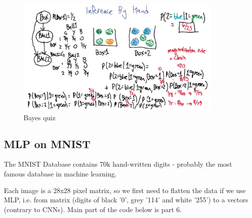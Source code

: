 \documentclass[11pt]{article}
\begin{document}
\begin{figure}[htbp] 
	\centering
	\includegraphics[width=0.9\textwidth]{pics/quiz_bayes}
	\caption{Bayes quiz} 
	\label{bayes_quiz}
\end{figure}


\subsection{MLP on MNIST} \label{mln_on_mnist}
The MNIST Database contains 70k hand-written digits - probably the most famous database in machine learning. 

Each image is a 28x28 pixel matrix, so we first need to flatten the data if we use MLP, i.e. from matrix (digits of black '0', grey '114' and white '255') to a vectors (contrary to CNNs). Main part of the code below is part $6$.
\end{document}
